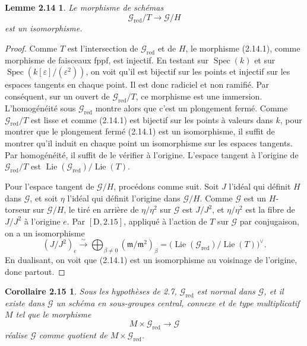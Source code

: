 \documentclass[11pt]{article}
\newcommand{\Lie}{\operatorname{Lie}}
\newcommand{\red}{\mathrm{red}}
\newtheorem*{lemme214}{Lemme 2.14}
\newtheorem*{corollaire215}{Corollaire 2.15}
\begin{document}
\begin{lemme214}
Le morphisme de schémas
\begin{equation}
  \mathcal G_{\red}/T\longrightarrow\mathcal G/H
  \tag{2.14.1}
\end{equation}
est un isomorphisme.
\end{lemme214}

\begin{proof}
Comme \(T\) est l'intersection de \(\mathcal G_{\red}\) et de \(H\), le morphisme
(2.14.1), comme morphisme de faisceaux fppf, est injectif. En testant sur
\(\operatorname{Spec}(k)\) et sur \(\operatorname{Spec}(k[\varepsilon]/(\varepsilon^2))\),
on voit qu'il est bijectif sur les points et injectif sur les espaces tangents en chaque
point. Il est donc radiciel et non ramifié. Par conséquent, sur un ouvert de
\(\mathcal G_{\red}/T\), ce morphisme est une immersion. L'homogénéité sous
\(\mathcal G_{\red}\) montre alors que c'est un plongement fermé. Comme
\(\mathcal G_{\red}/T\) est lisse et comme (2.14.1) est bijectif sur les points à valeurs
dans \(k\), pour montrer que le plongement fermé (2.14.1) est un isomorphisme, il suffit
de montrer qu'il induit en chaque point un isomorphisme sur les espaces tangents. Par
homogénéité, il suffit de le vérifier à l'origine. L'espace tangent à l'origine de
\(\mathcal G_{\red}/T\) est \(\Lie(\mathcal G_{\red})/\Lie(T)\).

Pour l'espace tangent de \(\mathcal G/H\), procédons comme suit. Soit \(J\) l'idéal qui
définit \(H\) dans \(\mathcal G\), et soit \(\eta\) l'idéal qui définit l'origine dans
\(\mathcal G/H\). Comme \(\mathcal G\) est un \(H\)-torseur sur \(\mathcal G/H\), le
tiré en arrière de \(\eta/\eta^2\) sur \(\mathcal G\) est \(J/J^2\), et \(\eta/\eta^2\)
est la fibre de \(J/J^2\) à l'origine \(e\). Par \([\mathrm D,2.15]\), appliqué à
l'action de \(T\) sur \(\mathcal G\) par conjugaison, on a un isomorphisme
\[
  (J/J^2)_e\xrightarrow{\sim}
  \bigoplus_{\beta\ne0}(\mathfrak m/\mathfrak m^2)_\beta
  =\bigl(\Lie(\mathcal G_{\red})/\Lie(T)\bigr)^\vee .
\]
En dualisant, on voit que (2.14.1) est un isomorphisme au voisinage de l'origine, donc
partout.
\end{proof}

\begin{corollaire215}
Sous les hypothèses de 2.7, \(\mathcal G_{\red}\) est normal dans \(\mathcal G\), et il
existe dans \(\mathcal G\) un schéma en sous-groupes central, connexe et de type
multiplicatif \(M\) tel que le morphisme
\[
  M\times\mathcal G_{\red}\longrightarrow\mathcal G
\]
réalise \(\mathcal G\) comme quotient de \(M\times\mathcal G_{\red}\).
\end{corollaire215}
\end{document}
